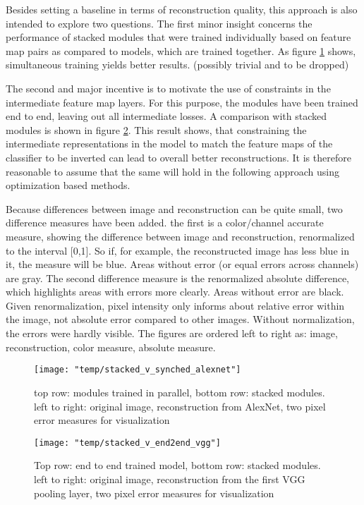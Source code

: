 \documentclass{article}
\begin{document}
Besides setting a baseline in terms of reconstruction quality, this approach is also intended to explore two questions. The first minor insight concerns the performance of stacked modules that were trained individually based on feature map pairs as compared to models, which are trained together. As figure \ref{fig:stack_v_sync} shows, simultaneous training yields better results. (possibly trivial and to be dropped)

The second and major incentive is to motivate the use of constraints in the intermediate feature map layers. For this purpose, the modules have been trained end to end, leaving out all intermediate losses. A comparison with stacked modules is shown in figure \ref{fig:stack_v_end2end}. This result shows, that constraining the intermediate representations in the model to match the feature maps of the classifier to be inverted can lead to overall better reconstructions. It is therefore reasonable to assume that the same will hold in the following approach using optimization based methods.

Because differences between image and reconstruction can be quite small, two difference measures have been added. the first is a color/channel accurate measure, showing the difference between image and reconstruction, renormalized to the interval [0,1]. So if, for example, the reconstructed image has less blue in it, the measure will be blue. Areas without error (or equal errors across channels) are gray. The second difference measure is the renormalized absolute difference, which highlights areas with errors more clearly. Areas without error are black. Given renormalization,  pixel intensity only informs about relative error within the image, not absolute error compared to other images. Without normalization, the errors were hardly visible. The figures are ordered left to right as: image, reconstruction, color measure, absolute measure. 

\begin{figure}
	\centering
	\texttt{[image: "temp/stacked\_v\_synched\_alexnet"]}
	\caption{top row: modules trained in parallel, bottom row: stacked modules.
		left to right: original image, reconstruction from AlexNet, two pixel error measures for visualization}
	\label{fig:stack_v_sync}
\end{figure}

\begin{figure}
	\centering
	\texttt{[image: "temp/stacked\_v\_end2end\_vgg"]}
	\caption{Top row: end to end trained model, bottom row: stacked modules. 
		left to right: original image, reconstruction from the first VGG pooling layer, two pixel error measures for visualization}
	\label{fig:stack_v_end2end}
\end{figure}
\end{document}
